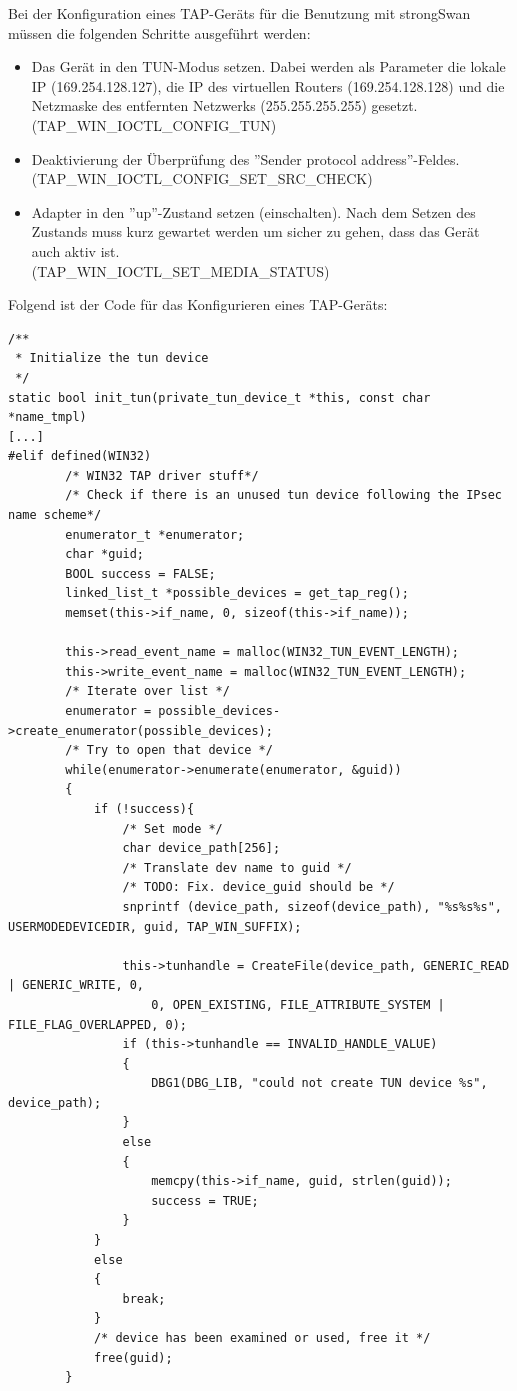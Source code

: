 {Bei der Konfiguration eines TAP-Geräts für die Benutzung mit strongSwan müssen die folgenden
Schritte ausgeführt werden:
\begin{itemize}
\item Das Gerät in den TUN-Modus setzen. Dabei werden als Parameter
die lokale IP (169.254.128.127), die IP des virtuellen Routers (169.254.128.128)
und die Netzmaske des entfernten Netzwerks (255.255.255.255) gesetzt. 
(TAP\_WIN\_IOCTL\_CONFIG\_TUN)
\item Deaktivierung der Überprüfung des ''Sender protocol address''-Feldes.\\
(TAP\_WIN\_IOCTL\_CONFIG\_SET\_SRC\_CHECK)
\item Adapter in den ''up''-Zustand setzen (einschalten). 
Nach dem Setzen des Zustands muss kurz gewartet werden um sicher zu gehen, dass das Gerät auch aktiv ist.\\
(TAP\_WIN\_IOCTL\_SET\_MEDIA\_STATUS)
\end{itemize}

Folgend ist der Code für das Konfigurieren eines TAP-Geräts:
\begin{lstlisting}[caption=Konfiguration eines TAP-Geräts]
/**
 * Initialize the tun device
 */
static bool init_tun(private_tun_device_t *this, const char *name_tmpl)
[...]
#elif defined(WIN32)
        /* WIN32 TAP driver stuff*/
        /* Check if there is an unused tun device following the IPsec name scheme*/
        enumerator_t *enumerator;
        char *guid;
        BOOL success = FALSE;
        linked_list_t *possible_devices = get_tap_reg();
        memset(this->if_name, 0, sizeof(this->if_name));

        this->read_event_name = malloc(WIN32_TUN_EVENT_LENGTH);
        this->write_event_name = malloc(WIN32_TUN_EVENT_LENGTH);
        /* Iterate over list */
        enumerator = possible_devices->create_enumerator(possible_devices);
        /* Try to open that device */
        while(enumerator->enumerate(enumerator, &guid))
        {
            if (!success){
                /* Set mode */
                char device_path[256];
                /* Translate dev name to guid */
                /* TODO: Fix. device_guid should be */
                snprintf (device_path, sizeof(device_path), "%s%s%s", USERMODEDEVICEDIR, guid, TAP_WIN_SUFFIX);

                this->tunhandle = CreateFile(device_path, GENERIC_READ | GENERIC_WRITE, 0,
                    0, OPEN_EXISTING, FILE_ATTRIBUTE_SYSTEM | FILE_FLAG_OVERLAPPED, 0);
                if (this->tunhandle == INVALID_HANDLE_VALUE)
                {
                    DBG1(DBG_LIB, "could not create TUN device %s", device_path);
                }
                else
                {
                    memcpy(this->if_name, guid, strlen(guid));
                    success = TRUE;
                }
            }
            else
            {
                break;
            }
            /* device has been examined or used, free it */
            free(guid);
        }


\end{lstlisting}}
